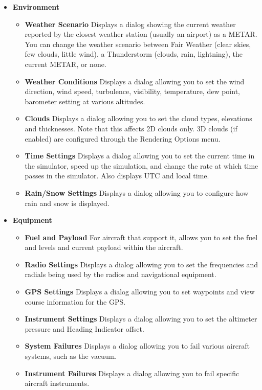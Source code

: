 \begin{itemize}
\item \textbf{Environment}
 \begin{itemize}
  \item \textbf{Weather Scenario} Displays a dialog showing the current weather
reported by the closest
  weather station (usually an airport) as a METAR. You can change the weather
scenario between
  Fair Weather (clear skies, few clouds, little wind), a Thunderstorm (clouds,
rain, lightning), the current METAR, or none.
  \item \textbf{Weather Conditions}  Displays a dialog allowing you to set the
wind direction, wind speed,
  turbulence, visibility, temperature, dew point, barometer setting at various
altitudes.
  \item \textbf{Clouds}  Displays a dialog allowing you to set the cloud types,
elevations and thicknesses.
  Note that this affects 2D clouds only. 3D clouds (if enabled) are configured
through the Rendering Options menu.
  \item \textbf{Time Settings}  Displays a dialog allowing you to set the current
time in the simulator, speed up the simulation, and change the rate at which
time passes in the simulator. Also displays UTC and local time.
  \item \textbf{Rain/Snow Settings}  Displays a dialog allowing you to
configure how rain and snow is displayed.
 \end{itemize}

\item \textbf{Equipment}
 \begin{itemize}
  \item \textbf{Fuel and Payload}  For aircraft that support it, allows you to
set the fuel and levels
  and current payload within the aircraft.
  \item \textbf{Radio Settings}  Displays a dialog allowing you to set the
frequencies and radials being
  used by the radios and navigational equipment.
  \item \textbf{GPS Settings}  Displays a dialog allowing you to set waypoints
and view course information for the GPS.
  \item \textbf{Instrument Settings}  Displays a dialog allowing you to set the
altimeter pressure and Heading Indicator offset.
  \item \textbf{System Failures} Displays a dialog allowing you to fail various
aircraft systems, such as the vacuum.
  \item \textbf{Instrument Failures}  Displays a dialog allowing you to fail
specific aircraft instruments.
 \end{itemize}


\end{itemize}
